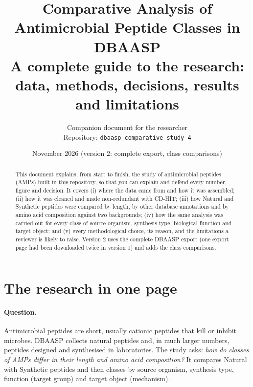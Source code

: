 \documentclass[11pt,a4paper]{article}
\title{\textbf{Comparative Analysis of Antimicrobial Peptide Classes in DBAASP}\\[4pt]
\large A complete guide to the research: data, methods, decisions, results and limitations}
\author{Companion document for the researcher\\\small Repository: \texttt{dbaasp\_comparative\_study\_4}}
\date{November 2026 \quad(version 2: complete export, class comparisons)}
\begin{document}
\maketitle

\begin{abstract}
\noindent This document explains, from start to finish, the study of antimicrobial peptides (AMPs) built in this repository, so that you can explain and defend every number,
figure and decision. It covers (i) where the data came from and how it was assembled; (ii) how it was cleaned and made non-redundant with CD-HIT;
(iii) how Natural and Synthetic peptides were compared by length, by other database annotations and by amino acid composition against two backgrounds;
(iv) how the same analysis was carried out for every class of source organism, synthesis type, biological function and target object; and
(v) every methodological choice, its reason, and the limitations a reviewer is likely to raise. Version 2 uses the complete DBAASP export
(one export page had been downloaded twice in version 1) and adds the class comparisons.
\end{abstract}

\tableofcontents
\newpage

\section{The research in one page}

\paragraph{Question.} Antimicrobial peptides are short, usually cationic peptides that kill or inhibit microbes. DBAASP collects natural peptides and, in much larger
numbers, peptides designed and synthesised in laboratories. The study asks: \emph{how do classes of AMPs differ in their length and amino acid composition?}
It compares Natural with Synthetic peptides and then classes by source organism, synthesis type, function (target group) and target object (mechanism).
\end{document}
